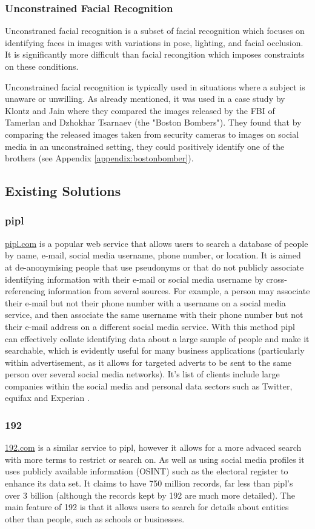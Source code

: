 \documentclass[12pt]{article}
\begin{document}
\subsubsection{Unconstrained Facial Recognition}
Unconstraned facial recognition is a subset of facial recognition which focuses on identifying faces in images with variations in pose, lighting, and facial occlusion. It is significantly more difficult than facial recongition which imposes constraints on these conditions.

Unconstrained facial recognition is typically used in situations where a subject is unaware or unwilling. As already mentioned, it was used in a case study by Klontz and Jain where they compared the images released by the FBI of Tamerlan and Dzhokhar Tsarnaev (the "Boston Bombers"). They found that by comparing the released images taken from security cameras to images on social media in an unconstrained setting, they could positively identify one of the brothers \citep{bostonbombingcasestudy} (see Appendix \ref{appendix:bostonbomber}).

\subsection{Existing Solutions}
\subsubsection{pipl}
\url{pipl.com} is a popular web service that allows users to search a database of people by name, e-mail, social media username, phone number, or location. It is aimed at de-anonymising people that use pseudonyms or that do not publicly associate identifying information with their e-mail or social media username by cross-referencing information from several sources. For example, a person may associate their e-mail but not their phone number with a username on a social media service, and then associate the same username with their phone number but not their e-mail address on a different social media service. With this method pipl can effectively collate identifying data about a large sample of people and make it searchable, which is evidently useful for many business applications (particularly within advertisement, as it allows for targeted adverts to be sent to the same person over several social media networks). It's list of clients include large companies within the social media and personal data sectors such as Twitter, equifax and Experian \citep{pipl}.

\subsubsection{192}
\url{192.com} is a similar service to pipl, however it allows for a more advaced search with more terms to restrict or search on. As well as using social media profiles it uses publicly available information (OSINT) such as the electoral register to enhance its data set. It claims to have 750 million records, far less than pipl's over 3 billion (although the records kept by 192 are much more detailed). The main feature of 192 is that it allows users to search for details about entities other than people, such as schools or businesses.
\end{document}
